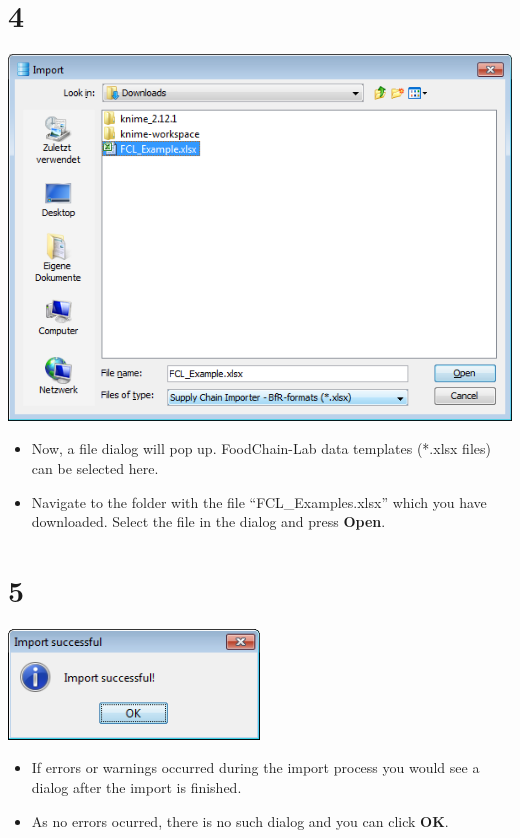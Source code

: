 \documentclass[10pt]{beamer}
\begin{document}
\section{4}
\begin{frame}
	\begin{center}
  		\includegraphics[height=0.6\textheight]{4.png}
	\end{center}
	\begin{itemize}
		\item Now, a file dialog will pop up. FoodChain-Lab data templates (*.xlsx files) can be selected here.
		\item Navigate to the folder with the file ``FCL\_Examples.xlsx'' which you have  downloaded.  Select the file in the dialog and press \textbf{Open}.
	\end{itemize}
\end{frame}

\section{5}
\begin{frame}
	\begin{center}
  		\includegraphics[width=0.5\textwidth]{5.png}
	\end{center}
	\begin{itemize}
		\item If errors or warnings occurred during the import process you would see a dialog after the import is finished.
		\item As no errors ocurred, there is no such dialog and you can click \textbf{OK}.
	\end{itemize}
\end{frame}
\end{document}
